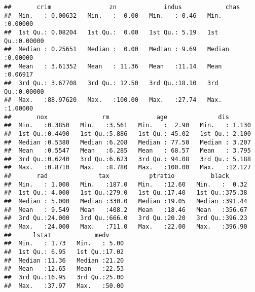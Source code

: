 \documentclass[]{article}
\newenvironment{Shaded}{\begin{snugshade}}{\end{snugshade}}
\newcommand{\CommentTok}[1]{\textcolor[rgb]{0.56,0.35,0.01}{\textit{#1}}}
\newcommand{\DataTypeTok}[1]{\textcolor[rgb]{0.13,0.29,0.53}{#1}}
\newcommand{\DecValTok}[1]{\textcolor[rgb]{0.00,0.00,0.81}{#1}}
\newcommand{\KeywordTok}[1]{\textcolor[rgb]{0.13,0.29,0.53}{\textbf{#1}}}
\newcommand{\NormalTok}[1]{#1}
\newcommand{\OperatorTok}[1]{\textcolor[rgb]{0.81,0.36,0.00}{\textbf{#1}}}
\newcommand{\StringTok}[1]{\textcolor[rgb]{0.31,0.60,0.02}{#1}}
\begin{document}
\begin{verbatim}
##       crim                zn             indus            chas        
##  Min.   : 0.00632   Min.   :  0.00   Min.   : 0.46   Min.   :0.00000  
##  1st Qu.: 0.08204   1st Qu.:  0.00   1st Qu.: 5.19   1st Qu.:0.00000  
##  Median : 0.25651   Median :  0.00   Median : 9.69   Median :0.00000  
##  Mean   : 3.61352   Mean   : 11.36   Mean   :11.14   Mean   :0.06917  
##  3rd Qu.: 3.67708   3rd Qu.: 12.50   3rd Qu.:18.10   3rd Qu.:0.00000  
##  Max.   :88.97620   Max.   :100.00   Max.   :27.74   Max.   :1.00000  
##       nox               rm             age              dis        
##  Min.   :0.3850   Min.   :3.561   Min.   :  2.90   Min.   : 1.130  
##  1st Qu.:0.4490   1st Qu.:5.886   1st Qu.: 45.02   1st Qu.: 2.100  
##  Median :0.5380   Median :6.208   Median : 77.50   Median : 3.207  
##  Mean   :0.5547   Mean   :6.285   Mean   : 68.57   Mean   : 3.795  
##  3rd Qu.:0.6240   3rd Qu.:6.623   3rd Qu.: 94.08   3rd Qu.: 5.188  
##  Max.   :0.8710   Max.   :8.780   Max.   :100.00   Max.   :12.127  
##       rad              tax           ptratio          black       
##  Min.   : 1.000   Min.   :187.0   Min.   :12.60   Min.   :  0.32  
##  1st Qu.: 4.000   1st Qu.:279.0   1st Qu.:17.40   1st Qu.:375.38  
##  Median : 5.000   Median :330.0   Median :19.05   Median :391.44  
##  Mean   : 9.549   Mean   :408.2   Mean   :18.46   Mean   :356.67  
##  3rd Qu.:24.000   3rd Qu.:666.0   3rd Qu.:20.20   3rd Qu.:396.23  
##  Max.   :24.000   Max.   :711.0   Max.   :22.00   Max.   :396.90  
##      lstat            medv      
##  Min.   : 1.73   Min.   : 5.00  
##  1st Qu.: 6.95   1st Qu.:17.02  
##  Median :11.36   Median :21.20  
##  Mean   :12.65   Mean   :22.53  
##  3rd Qu.:16.95   3rd Qu.:25.00  
##  Max.   :37.97   Max.   :50.00
\end{verbatim}

\begin{Shaded}
\end{Shaded}
\end{document}
